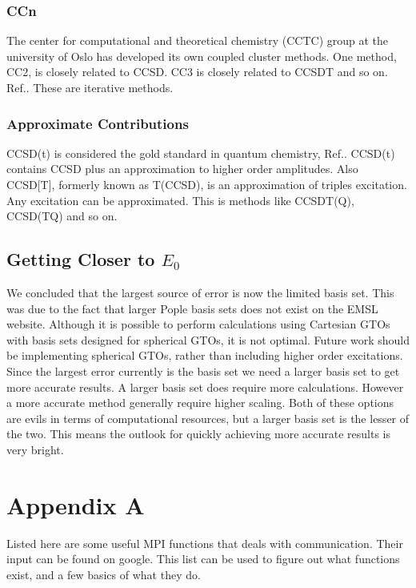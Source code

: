 \documentclass[a4paper,norsk,11pt,twoside]{report}
\begin{document}
\subsection{CCn}
The center for computational and theoretical chemistry (CCTC) group at the university of Oslo has developed its own coupled cluster methods. One method, CC2, is closely related to CCSD. CC3 is closely related to CCSDT and so on. Ref.\cite{cc3_metode_artikl}. These are iterative methods. 

\subsection{Approximate Contributions}
CCSD(t) is considered the gold standard in quantum chemistry, Ref.\cite{ccsdt_approxim_method}. CCSD(t) contains CCSD plus an approximation to higher order amplitudes. Also CCSD[T], formerly known as T(CCSD), is an approximation of triples excitation. Any excitation can be approximated. This is methods like CCSDT(Q), CCSD(TQ) and so on. 

\section{Getting Closer to $E_0$}
We concluded that the largest source of error is now the limited basis set. This was due to the fact that larger Pople basis sets does not exist on the EMSL website. Although it is possible to perform calculations using Cartesian GTOs with basis sets designed for spherical GTOs, it is not optimal. Future work should be implementing spherical GTOs, rather than including higher order excitations. \\

Since the largest error currently is the basis set we need a larger basis set to get more accurate results. A larger basis set does require more calculations. However a more accurate method generally require higher scaling. Both of these options are evils in terms of computational resources, but a larger basis set is the lesser of the two. This means the outlook for quickly achieving more accurate results is very bright. 

\chapter{Appendix A}

Listed here are some useful MPI functions that deals with communication. Their input can be found on google. This list can be used to figure out what functions exist, and a few basics of what they do. 
\end{document}
